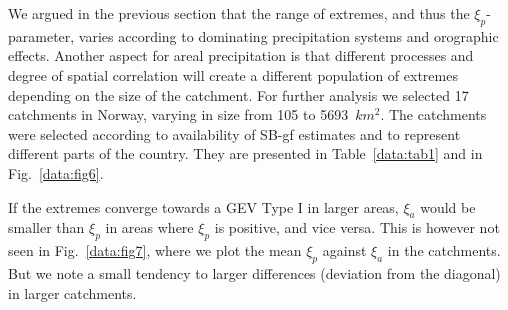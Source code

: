\documentclass[12pt,a4paper,english]{article}
\begin{document}
    

We argued in the previous section that the range of extremes, and thus the $\xi_{p}$-parameter, varies according to dominating precipitation systems and orographic effects. Another aspect for areal precipitation is that different processes and degree of spatial correlation will create a different population of extremes depending on the size of the catchment.
For further analysis we selected 17 catchments in Norway, varying in size from 105 to 5693~$km^2$. The catchments were selected according to availability of SB-gf estimates and to represent different parts of the country. They are presented in Table~\ref{data:tab1} and in Fig.~\ref{data:fig6}.   

If the extremes converge towards a GEV Type I in larger areas, $\xi_{a}$ would be smaller than $\xi_{p}$ in areas where $\xi_{p}$ is positive, and vice versa. This is however not seen in Fig.~\ref{data:fig7}, where we plot the mean $\xi_{p}$ against $\xi_{a}$ in the catchments. But we note a small tendency to larger differences (deviation from the diagonal) in larger catchments.
\end{document}
